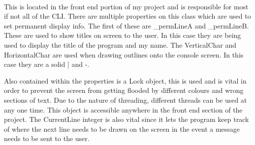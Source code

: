 \begin{FlushLeft}
    \begin{figure}[H]
        \centering
    \end{figure}\\

    This is located in the front end portion of my project and is responsible for most if not all of the CLI. There are multiple properties on this class which are used to set permanent display info. The first of these are \_permLineA and \_permLineB. These are used to show titles on screen to the user. In this case they are being used to display the title of the program and my name. The VerticalChar and HorizontalChar are used when drawing outlines onto the console screen. In this case they are a solid | and -. \\ \bk

    Also contained within the properties is a Lock object, this is used and is vital in order to prevent the screen from getting flooded by different colours and wrong sections of text. Due to the nature of threading, different threads can be used at any one time. This object is accessible anywhere in the front end section of the project. The CurrentLine integer is also vital since it lets the program keep track of where the next line needs to be drawn on the screen in the event a message needs to be sent to the user.\\ \bk


\end{FlushLeft}
